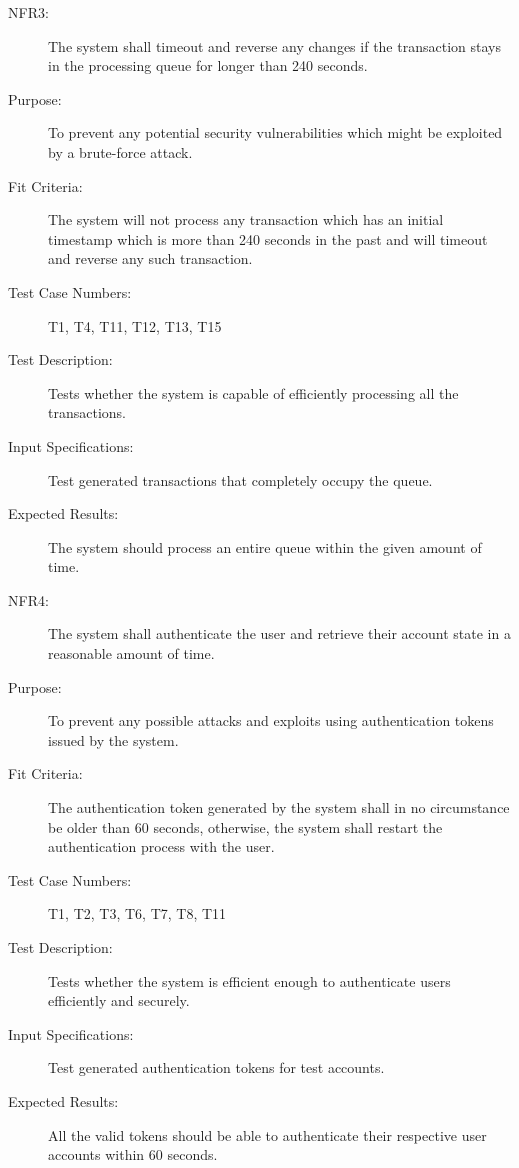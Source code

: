 \documentclass[a4paper,twoside,phd]{BYUPhys}
\begin{document}
\begin{description}
\item[NFR3:] The system shall timeout and reverse any changes if the transaction stays in the processing queue for longer than 240 seconds.
\item[Purpose:] To prevent any potential security vulnerabilities which might be exploited by a brute-force attack.
\item[Fit Criteria:] The system will not process any transaction which has an initial timestamp which is more than 240 seconds in the past and will timeout and reverse any such transaction.
\item[Test Case Numbers:] T1, T4, T11, T12, T13, T15
\item[Test Description:] Tests whether the system is capable of efficiently processing all the transactions.
\item[Input Specifications:] Test generated transactions that completely occupy the queue.
\item[Expected Results:] The system should process an entire queue within the given amount of time.

\item[NFR4:] The  system  shall  authenticate  the  user  and  retrieve  their  account  state in a reasonable amount of time.
\item[Purpose:] To prevent any possible attacks and exploits using authentication tokens issued by the system.
\item[Fit Criteria:] The authentication token generated by the system shall in no circumstance be older than 60 seconds, otherwise, the system shall restart the authentication process with the user.
\item[Test Case Numbers:] T1, T2, T3, T6, T7, T8, T11
\item[Test Description:] Tests whether the system is efficient enough to authenticate users efficiently and securely.
\item[Input Specifications:] Test generated authentication tokens for test accounts.
\item[Expected Results:] All the valid tokens should be able to authenticate their respective user accounts within 60 seconds.


\end{description}
\end{document}
